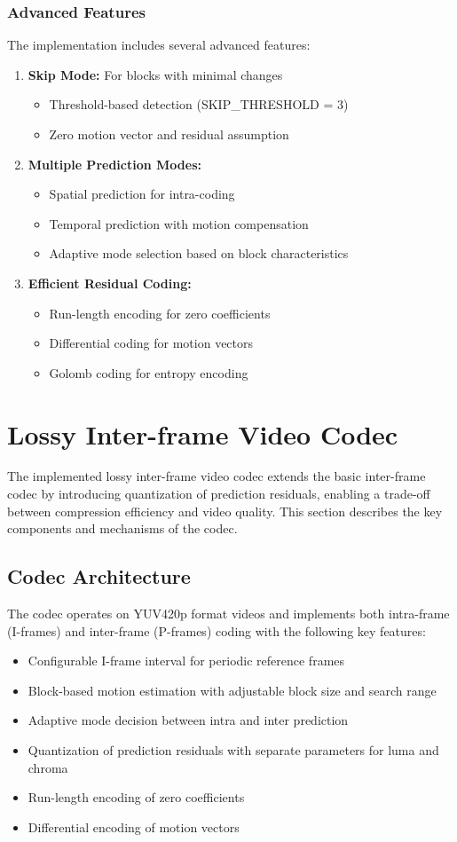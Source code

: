 \documentclass[a4paper,14pt]{article}
\begin{document}
\subsubsection{Advanced Features}
The implementation includes several advanced features:
\begin{enumerate}
\item \textbf{Skip Mode:} For blocks with minimal changes
\begin{itemize}
\item Threshold-based detection (SKIP\_THRESHOLD = 3)
\item Zero motion vector and residual assumption
\end{itemize}
\item \textbf{Multiple Prediction Modes:}
\begin{itemize}
    \item Spatial prediction for intra-coding
    \item Temporal prediction with motion compensation
    \item Adaptive mode selection based on block characteristics
\end{itemize}

\item \textbf{Efficient Residual Coding:}
\begin{itemize}
    \item Run-length encoding for zero coefficients
    \item Differential coding for motion vectors
    \item Golomb coding for entropy encoding
\end{itemize}
\end{enumerate}


\section{Lossy Inter-frame Video Codec}
The implemented lossy inter-frame video codec extends the basic inter-frame codec by introducing quantization of prediction residuals, enabling a trade-off between compression efficiency and video quality. This section describes the key components and mechanisms of the codec.
\subsection{Codec Architecture}
The codec operates on YUV420p format videos and implements both intra-frame (I-frames) and inter-frame (P-frames) coding with the following key features:
\begin{itemize}
\item Configurable I-frame interval for periodic reference frames
\item Block-based motion estimation with adjustable block size and search range
\item Adaptive mode decision between intra and inter prediction
\item Quantization of prediction residuals with separate parameters for luma and chroma
\item Run-length encoding of zero coefficients
\item Differential encoding of motion vectors
\end{itemize}
\end{document}
